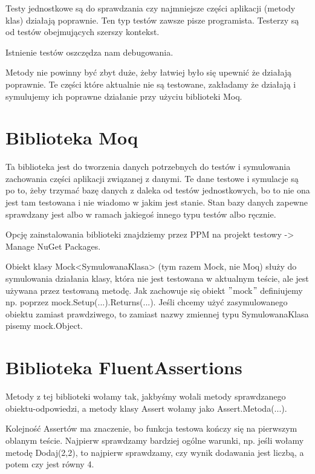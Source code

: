 \documentclass[10pt]{article}
\begin{document}
Testy jednostkowe są do sprawdzania czy najmniejsze części aplikacji (metody klas) działają poprawnie. Ten typ testów zawsze pisze programista. Testerzy są od testów obejmujących szerszy kontekst.

Istnienie testów oszczędza nam debugowania.

Metody nie powinny być zbyt duże, żeby łatwiej było się upewnić że działają poprawnie. Te części które aktualnie nie są testowane, zakładamy że działają i symulujemy ich poprawne działanie przy użyciu biblioteki Moq.

\section{Biblioteka Moq}
Ta biblioteka jest do tworzenia danych potrzebnych do testów i symulowania zachowania części aplikacji związanej z danymi. Te dane testowe i symulacje są po to, żeby trzymać bazę danych z daleka od testów jednostkowych, bo to nie ona jest tam testowana i nie wiadomo w jakim jest stanie. Stan bazy danych zapewne sprawdzany jest albo w ramach jakiegoś innego typu testów albo ręcznie.

Opcję zainstalowania biblioteki znajdziemy przez PPM na projekt testowy -> Manage NuGet Packages.

Obiekt klasy Mock<SymulowanaKlasa> (tym razem Mock, nie Moq) służy do symulowania działania klasy, która nie jest testowana w aktualnym teście, ale jest używana przez testowaną metodę. Jak zachowuje się obiekt $"$mock$"$ definiujemy np. poprzez mock.Setup(...).Returns(...). Jeśli chcemy użyć zasymulowanego obiektu zamiast prawdziwego, to zamiast nazwy zmiennej typu SymulowanaKlasa pisemy mock.Object.

\section{Biblioteka FluentAssertions}
Metody z tej biblioteki wołamy tak, jakbyśmy wołali metody sprawdzanego obiektu-odpowiedzi, a metody klasy Assert wołamy jako Assert.Metoda(...).

Kolejność Assertów ma znaczenie, bo funkcja testowa kończy się na pierwszym oblanym teście. Najpierw sprawdzamy bardziej ogólne warunki, np. jeśli wołamy metodę Dodaj(2,2), to najpierw sprawdzamy, czy wynik dodawania jest liczbą, a potem czy jest równy 4.
\end{document}
